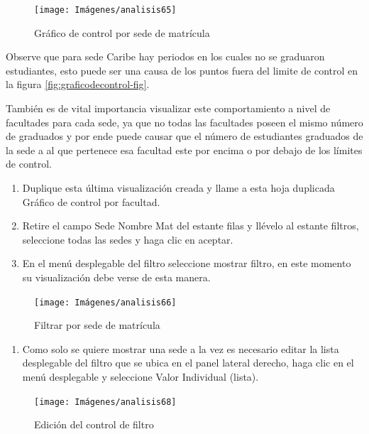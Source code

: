 \documentclass[
]{book}
\providecommand{\tightlist}{%
  \setlength{\itemsep}{0pt}\setlength{\parskip}{0pt}}
\begin{document}
\begin{figure}

{\centering \texttt{[image: Imágenes/analisis65]} 

}

\caption{Gráfico de control por sede de matrícula}\label{fig:controlsede-fig}
\end{figure}

Observe que para sede Caribe hay periodos en los cuales no se graduaron estudiantes, esto puede ser una causa de los puntos fuera del limite de control en la figura \ref{fig:graficodecontrol-fig}.

También es de vital importancia visualizar este comportamiento a nivel de facultades para cada sede, ya que no todas las facultades poseen el mismo número de graduados y por ende puede causar que el número de estudiantes graduados de la sede a al que pertenece esa facultad este por encima o por debajo de los límites de control.

\begin{enumerate}
\def\labelenumi{\arabic{enumi}.}
\item
  Duplique esta última visualización creada y llame a esta hoja duplicada Gráfico de control por facultad.
\item
  Retire el campo Sede Nombre Mat del estante filas y llévelo al estante filtros, seleccione todas las sedes y haga clic en aceptar.
\item
  En el menú desplegable del filtro seleccione mostrar filtro, en este momento su visualización debe verse de esta manera.
\end{enumerate}

\begin{figure}

{\centering \texttt{[image: Imágenes/analisis66]} 

}

\caption{Filtrar por sede de matrícula}\label{fig:paso3controlfacultad-fig}
\end{figure}

\begin{enumerate}
\def\labelenumi{\arabic{enumi}.}
\setcounter{enumi}{3}
\tightlist
\item
  Como solo se quiere mostrar una sede a la vez es necesario editar la lista desplegable del filtro que se ubica en el panel lateral derecho, haga clic en el menú desplegable y seleccione Valor Individual (lista).
\end{enumerate}

\begin{figure}

{\centering \texttt{[image: Imágenes/analisis68]} 

}

\caption{Edición del control de filtro}\label{fig:paso4controlfacultad-fig}
\end{figure}
\end{document}
